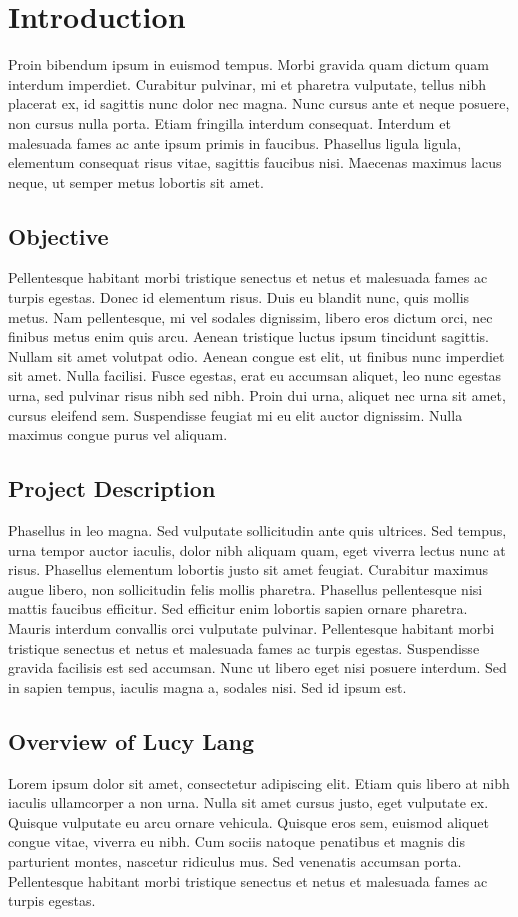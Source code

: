 \chapter{Introduction}
Proin bibendum ipsum in euismod tempus. Morbi gravida quam dictum quam interdum imperdiet. Curabitur pulvinar, mi et pharetra vulputate, tellus nibh placerat ex, id sagittis nunc dolor nec magna. Nunc cursus ante et neque posuere, non cursus nulla porta. Etiam fringilla interdum consequat. Interdum et malesuada fames ac ante ipsum primis in faucibus. Phasellus ligula ligula, elementum consequat risus vitae, sagittis faucibus nisi. Maecenas maximus lacus neque, ut semper metus lobortis sit amet.


\section{Objective}
Pellentesque habitant morbi tristique senectus et netus et malesuada fames ac turpis egestas. Donec id elementum risus. Duis eu blandit nunc, quis mollis metus. Nam pellentesque, mi vel sodales dignissim, libero eros dictum orci, nec finibus metus enim quis arcu. Aenean tristique luctus ipsum tincidunt sagittis. Nullam sit amet volutpat odio. Aenean congue est elit, ut finibus nunc imperdiet sit amet. Nulla facilisi. Fusce egestas, erat eu accumsan aliquet, leo nunc egestas urna, sed pulvinar risus nibh sed nibh. Proin dui urna, aliquet nec urna sit amet, cursus eleifend sem. Suspendisse feugiat mi eu elit auctor dignissim. Nulla maximus congue purus vel aliquam.


\section{Project Description}
Phasellus in leo magna. Sed vulputate sollicitudin ante quis ultrices. Sed tempus, urna tempor auctor iaculis, dolor nibh aliquam quam, eget viverra lectus nunc at risus. Phasellus elementum lobortis justo sit amet feugiat. Curabitur maximus augue libero, non sollicitudin felis mollis pharetra. Phasellus pellentesque nisi mattis faucibus efficitur. Sed efficitur enim lobortis sapien ornare pharetra. Mauris interdum convallis orci vulputate pulvinar. Pellentesque habitant morbi tristique senectus et netus et malesuada fames ac turpis egestas. Suspendisse gravida facilisis est sed accumsan. Nunc ut libero eget nisi posuere interdum. Sed in sapien tempus, iaculis magna a, sodales nisi. Sed id ipsum est.


\section{Overview of Lucy Lang}
Lorem ipsum dolor sit amet, consectetur adipiscing elit. Etiam quis libero at nibh iaculis ullamcorper a non urna. Nulla sit amet cursus justo, eget vulputate ex. Quisque vulputate eu arcu ornare vehicula. Quisque eros sem, euismod aliquet congue vitae, viverra eu nibh. Cum sociis natoque penatibus et magnis dis parturient montes, nascetur ridiculus mus. Sed venenatis accumsan porta. Pellentesque habitant morbi tristique senectus et netus et malesuada fames ac turpis egestas.


